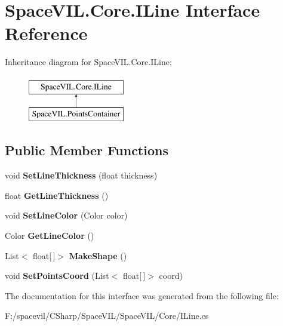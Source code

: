 \hypertarget{interface_space_v_i_l_1_1_core_1_1_i_line}{}\section{Space\+V\+I\+L.\+Core.\+I\+Line Interface Reference}
\label{interface_space_v_i_l_1_1_core_1_1_i_line}
Inheritance diagram for Space\+V\+I\+L.\+Core.\+I\+Line\+:\begin{figure}[H]
\begin{center}
\leavevmode
\includegraphics[height=2.000000cm]{interface_space_v_i_l_1_1_core_1_1_i_line}
\end{center}
\end{figure}
\subsection*{Public Member Functions}
\begin{DoxyCompactItemize}
\item 
\mbox{\label{interface_space_v_i_l_1_1_core_1_1_i_line_acb10ebef121cdc2ba63aaf088bdd6529}} 
void {\bfseries Set\+Line\+Thickness} (float thickness)
\item 
\mbox{\label{interface_space_v_i_l_1_1_core_1_1_i_line_a4ca59e6fab1ab21ed067777f9c7394bc}} 
float {\bfseries Get\+Line\+Thickness} ()
\item 
\mbox{\label{interface_space_v_i_l_1_1_core_1_1_i_line_a01fbf6f699cbecf9ab32322c743351f9}} 
void {\bfseries Set\+Line\+Color} (Color color)
\item 
\mbox{\label{interface_space_v_i_l_1_1_core_1_1_i_line_aa8bf019f696af52bc2c37cd48b314d74}} 
Color {\bfseries Get\+Line\+Color} ()
\item 
\mbox{\label{interface_space_v_i_l_1_1_core_1_1_i_line_a5ee2b334c5452eeda1b57c63605386cf}} 
List$<$ float\mbox{[}$\,$\mbox{]}$>$ {\bfseries Make\+Shape} ()
\item 
\mbox{\label{interface_space_v_i_l_1_1_core_1_1_i_line_afbf7ee3a7286492b8f3833fa2dc3f886}} 
void {\bfseries Set\+Points\+Coord} (List$<$ float\mbox{[}$\,$\mbox{]}$>$ coord)
\end{DoxyCompactItemize}


The documentation for this interface was generated from the following file\+:\begin{DoxyCompactItemize}
\item 
F\+:/spacevil/\+C\+Sharp/\+Space\+V\+I\+L/\+Space\+V\+I\+L/\+Core/I\+Line.\+cs\end{DoxyCompactItemize}
